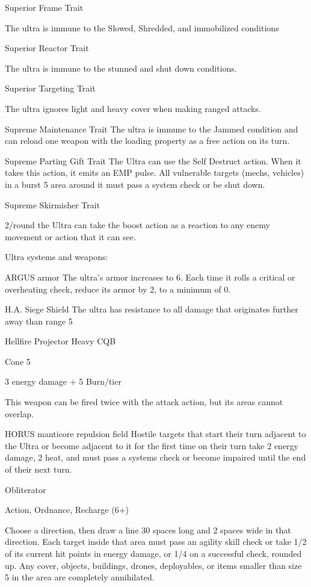 Superior Frame  
Trait
 
The ultra is immune to the Slowed, Shredded, and immobilized conditions
 

Superior Reactor  
Trait
 
The ultra is immune to the stunned and shut down conditions.
 

Superior Targeting  
Trait
 
The ultra ignores light and heavy cover when making ranged attacks.
 

Supreme Maintenance  
Trait  
The ultra is immune to the Jammed condition and can reload one weapon with the loading  
property as a free action on its turn.
 

Supreme Parting Gift  
Trait  
The Ultra can use the Self Destruct action. When it takes this action, it emits an EMP pulse. All  
vulnerable targets (mechs, vehicles) in a burst 5 area around it must pass a system check or be  
shut down.
 

Supreme Skirmisher  
Trait
 
2/round the Ultra can take the boost action as a reaction to any enemy movement or action that  
it can see.
 

Ultra systems and weapons:  

ARGUS armor  
The ultra’s armor increases to 6. Each time it rolls a critical or overheating check, reduce its  
armor by 2, to a minimum of 0.
 

H.A. Siege Shield  
The ultra has resistance to all damage that originates further away than range 5
 

Hellfire Projector  
Heavy CQB
 
Cone 5
 
3 energy damage + 5 Burn/tier
 
This weapon can be fired twice with the attack action, but its areas cannot overlap.
 

                                                                                                                   


HORUS manticore repulsion field  
Hostile targets that start their turn adjacent to the Ultra or become adjacent to it for the first time  
on their turn take 2 energy damage, 2 heat, and must pass a systems check or become impaired  
until the end of their next turn.
 

Obliterator
 
Action, Ordnance, Recharge (6+)
 
Choose a direction, then draw a line 30 spaces long and 2 spaces wide in that direction. Each  
target inside that area must pass an agility skill check or take 1/2 of its current hit points in energy  
damage, or 1/4 on a successful check, rounded up. Any cover, objects, buildings, drones,  
deployables, or items smaller than size 5 in the area are completely annihilated.
 

